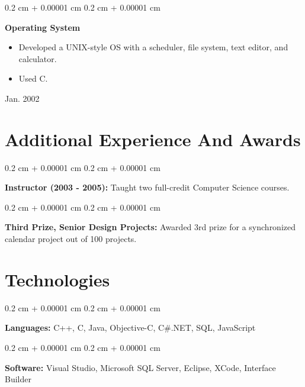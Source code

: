 \documentclass[10pt, letterpaper]{article}
\newenvironment{highlights}{
    \begin{itemize}[
        topsep=0.10 cm,
        parsep=0.10 cm,
        partopsep=0pt,
        itemsep=0pt,
        leftmargin=0.4 cm + 10pt
    ]
}{
    \end{itemize}
} %
\newenvironment{onecolentry}{
    \begin{adjustwidth}{
        0.2 cm + 0.00001 cm
    }{
        0.2 cm + 0.00001 cm
    }
}{
    \end{adjustwidth}
} %
\newenvironment{twocolentry}[2][]{
    \onecolentry
    \def\secondColumn{#2}
    \setcolumnwidth{\fill, 4.5 cm}
    \begin{paracol}{2}
}{
    \switchcolumn \raggedleft \secondColumn
    \end{paracol}
    \endonecolentry
} %
\begin{document}
        \vspace{0.2 cm}

        \begin{twocolentry}{
            Jan. 2002
        }
            \textbf{Operating System}
            \begin{highlights}
                \item Developed a UNIX-style OS with a scheduler, file system, text editor, and calculator.
                \item Used C.
            \end{highlights}
        \end{twocolentry}



    
    \section{Additional Experience And Awards}

        
        \begin{onecolentry}
            \textbf{Instructor (2003 - 2005):} Taught two full-credit Computer Science courses.
        \end{onecolentry}

        \vspace{0.2 cm}

        \begin{onecolentry}
            \textbf{Third Prize, Senior Design Projects:} Awarded 3rd prize for a synchronized calendar project out of 100 projects.
        \end{onecolentry}


    
    \section{Technologies}

        
        \begin{onecolentry}
            \textbf{Languages:} C++, C, Java, Objective-C, C\#.NET, SQL, JavaScript
        \end{onecolentry}

        \vspace{0.2 cm}

        \begin{onecolentry}
            \textbf{Software:} Visual Studio, Microsoft SQL Server, Eclipse, XCode, Interface Builder
        \end{onecolentry}


    
\end{document}
